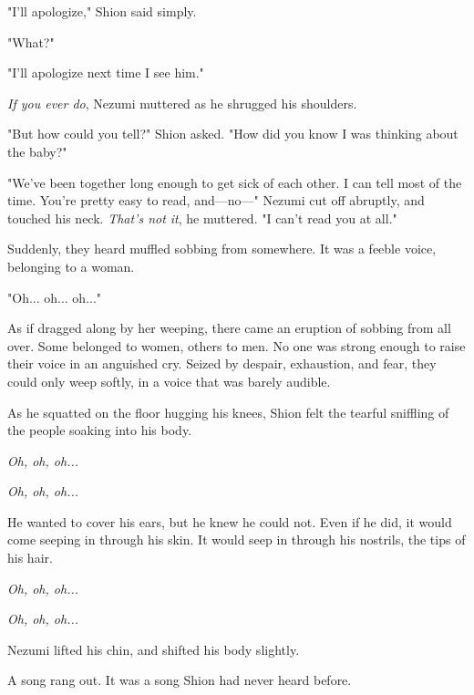 "I'll apologize," Shion said simply.

"What?"

"I'll apologize next time I see him."

\emph{If you ever do}, Nezumi muttered as he shrugged his shoulders.

"But how could you tell?" Shion asked. "How did you know I was thinking
about the baby?"

"We've been together long enough to get sick of each other. I can tell
most of the time. You're pretty easy to read, and---no---" Nezumi cut off
abruptly, and touched his neck. \emph{That's not it}, he muttered. "I can't
read you at all."

Suddenly, they heard muffled sobbing from somewhere. It was a feeble
voice, belonging to a woman.

"Oh... oh... oh..."

As if dragged along by her weeping, there came an eruption of sobbing
from all over. Some belonged to women, others to men. No one was strong
enough to raise their voice in an anguished cry. Seized by despair,
exhaustion, and fear, they could only weep softly, in a voice that was
barely audible.

As he squatted on the floor hugging his knees, Shion felt the tearful
sniffling of the people soaking into his body.

\emph{Oh, oh, oh...}

\emph{Oh, oh, oh...}

He wanted to cover his ears, but he knew he could not. Even if he did,
it would come seeping in through his skin. It would seep in through his
nostrils, the tips of his hair.

\emph{Oh, oh, oh...}

\emph{Oh, oh, oh...}

Nezumi lifted his chin, and shifted his body slightly.

A song rang out. It was a song Shion had never heard before.


